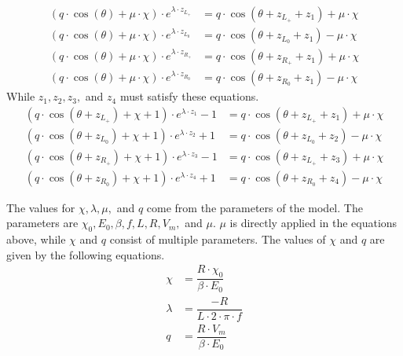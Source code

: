 \begin{subequations}
	\begin{align}
		(q \cdot \cos(\theta) + \mu \cdot \chi) \cdot e^{\lambda \cdot z_{L_+}}
		 & = q \cdot \cos(\theta + z_{L_+} + z_1) + \mu \cdot \chi \\
		(q \cdot \cos(\theta) + \mu \cdot \chi) \cdot e^{\lambda \cdot z_{L_0}}
		 & = q \cdot \cos(\theta + z_{L_0} + z_1) - \mu \cdot \chi \\
		(q \cdot \cos(\theta) + \mu \cdot \chi) \cdot e^{\lambda \cdot z_{R_+}}
		 & = q \cdot \cos(\theta + z_{R_+} + z_1) + \mu \cdot \chi \\
		(q \cdot \cos(\theta) + \mu \cdot \chi) \cdot e^{\lambda \cdot z_{R_0}}
		 & = q \cdot \cos(\theta + z_{R_0} + z_1) - \mu \cdot \chi
	\end{align}
\end{subequations}
While $z_1, z_2, z_3,$ and $z_4$ must satisfy these equations.
\begin{subequations}
	\begin{align}
		(q \cdot \cos(\theta + z_{L_+}) + \chi + 1) \cdot e^{\lambda \cdot z_1} - 1
		 & = q \cdot  \cos(\theta + z_{L_+} + z_1) + \mu \cdot \chi \\
		(q \cdot \cos(\theta + z_{L_0}) + \chi + 1) \cdot e^{\lambda \cdot z_2} + 1
		 & = q \cdot  \cos(\theta + z_{L_0} + z_2) - \mu \cdot \chi \\
		(q \cdot \cos(\theta + z_{R_+}) + \chi + 1) \cdot e^{\lambda \cdot z_3} - 1
		 & = q \cdot  \cos(\theta + z_{L_+} + z_3) + \mu \cdot \chi \\
		(q \cdot \cos(\theta + z_{R_0}) + \chi + 1) \cdot e^{\lambda \cdot z_4} + 1
		 & = q \cdot  \cos(\theta + z_{R_0} + z_4) - \mu \cdot \chi
	\end{align}
\end{subequations}


The values for $\chi, \lambda, \mu,$ and $q$ come from the parameters of the model.
The parameters are $\chi_0, E_0, \beta, f, L, R, V_m,$ and $\mu$.
$\mu$ is directly applied in the equations above, while $\chi$ and $q$ consist of multiple parameters.
The values of $\chi$ and $q$ are given by the following equations.
\begin{align}
	\chi    & = \dfrac{R \cdot \chi_0}{\beta \cdot E_0} \\
	\lambda & = \dfrac{-R}{L \cdot 2 \cdot \pi \cdot f} \\
	q       & = \dfrac{R \cdot V_m}{\beta \cdot E_0}
\end{align}
